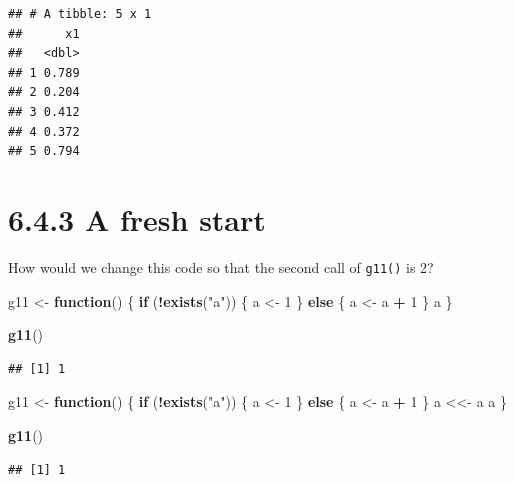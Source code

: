 \documentclass[]{book}
\newenvironment{Shaded}{\begin{snugshade}}{\end{snugshade}}
\newcommand{\ControlFlowTok}[1]{\textcolor[rgb]{0.13,0.29,0.53}{\textbf{#1}}}
\newcommand{\DecValTok}[1]{\textcolor[rgb]{0.00,0.00,0.81}{#1}}
\newcommand{\KeywordTok}[1]{\textcolor[rgb]{0.13,0.29,0.53}{\textbf{#1}}}
\newcommand{\NormalTok}[1]{#1}
\newcommand{\OperatorTok}[1]{\textcolor[rgb]{0.81,0.36,0.00}{\textbf{#1}}}
\newcommand{\StringTok}[1]{\textcolor[rgb]{0.31,0.60,0.02}{#1}}
\begin{document}
\begin{verbatim}
## # A tibble: 5 x 1
##      x1
##   <dbl>
## 1 0.789
## 2 0.204
## 3 0.412
## 4 0.372
## 5 0.794
\end{verbatim}

\hypertarget{a-fresh-start}{%
\section*{6.4.3 A fresh start}\label{a-fresh-start}}

How would we change this code so that the second call of \texttt{g11()} is 2?

\begin{Shaded}
\begin{Highlighting}[]
\NormalTok{g11 <-}\StringTok{ }\ControlFlowTok{function}\NormalTok{() \{}
  \ControlFlowTok{if}\NormalTok{ (}\OperatorTok{!}\KeywordTok{exists}\NormalTok{(}\StringTok{"a"}\NormalTok{)) \{}
\NormalTok{    a <-}\StringTok{ }\DecValTok{1}
\NormalTok{  \} }\ControlFlowTok{else}\NormalTok{ \{}
\NormalTok{    a <-}\StringTok{ }\NormalTok{a }\OperatorTok{+}\StringTok{ }\DecValTok{1}
\NormalTok{  \}}
\NormalTok{  a}
\NormalTok{\}}

\KeywordTok{g11}\NormalTok{()}
\end{Highlighting}
\end{Shaded}

\begin{verbatim}
## [1] 1
\end{verbatim}

\begin{Shaded}
\begin{Highlighting}[]
\NormalTok{g11 <-}\StringTok{ }\ControlFlowTok{function}\NormalTok{() \{}
  \ControlFlowTok{if}\NormalTok{ (}\OperatorTok{!}\KeywordTok{exists}\NormalTok{(}\StringTok{"a"}\NormalTok{)) \{}
\NormalTok{    a <-}\StringTok{ }\DecValTok{1}
\NormalTok{  \} }\ControlFlowTok{else}\NormalTok{ \{}
\NormalTok{    a <-}\StringTok{ }\NormalTok{a }\OperatorTok{+}\StringTok{ }\DecValTok{1}
\NormalTok{  \}}
\NormalTok{  a <<-}\StringTok{ }\NormalTok{a}
\NormalTok{  a}
\NormalTok{\}}

\KeywordTok{g11}\NormalTok{()}
\end{Highlighting}
\end{Shaded}

\begin{verbatim}
## [1] 1
\end{verbatim}
\end{document}
